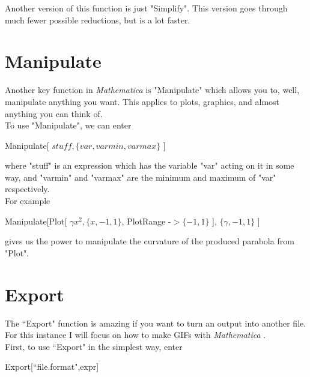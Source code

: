 \documentclass[11pt,letterpaper,twoside,titlepage]{report}
\newcommand{\Mathematica}{\textit{Mathematica} }
\begin{document}
			Another version of this function is just "Simplify".  This version goes through much fewer possible reductions, but is a lot faster.
			
		\chapter{Manipulate}
		
			Another key function in \Mathematica is "Manipulate" which allows you to, well, manipulate anything you want.  This applies to plots, graphics, and almost anything you can think of. \\
			
			To use "Manipulate", we can enter
			
			\begin{center}
			
				Manipulate[ $ stuff, \{ var, varmin, varmax \} $ ]
			
			\end{center}
			
			where "stuff" is an expression which has the variable "var" acting on it in some way, and "varmin" and "varmax" are the minimum and maximum of "var" respectively. \\
			
			For example
			
			\begin{center}
			
				Manipulate[Plot[ $ \gamma x^2, \{ x, -1, 1 \} $, PlotRange -$> \{ -1, 1 \} $ ], $ \{ \gamma, -1, 1 \} $ ]
			
			\end{center}
			
			gives us the power to manipulate the curvature of the produced parabola from "Plot".
			
		\chapter{Export}
		
			The ``Export" function is amazing if you want to turn an output into another file.  For this instance I will focus on how to make GIFs with \Mathematica. \\
			
			First, to use ``Export" in the simplest way, enter 
			
			\begin{center}
			
				Export[``file.format",expr]
			
			\end{center}
			
\end{document}
